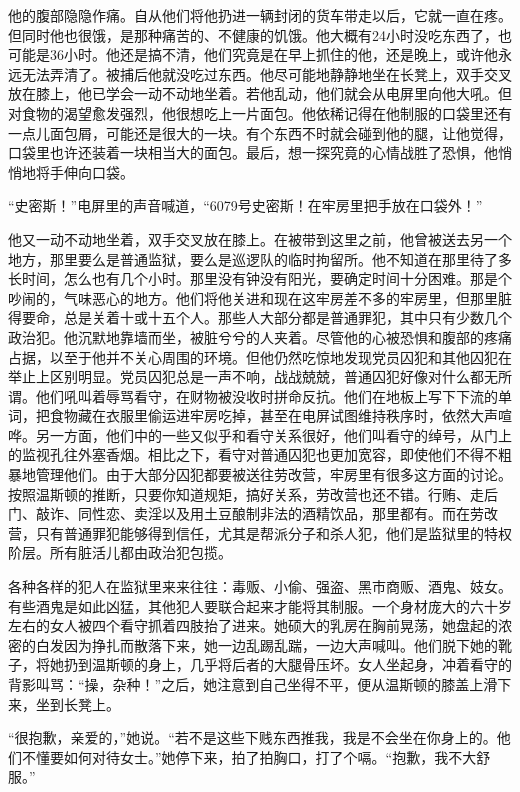 他的腹部隐隐作痛。自从他们将他扔进一辆封闭的货车带走以后，它就一直在疼。但同时他也很饿，是那种痛苦的、不健康的饥饿。他大概有24小时没吃东西了，也可能是36小时。他还是搞不清，他们究竟是在早上抓住的他，还是晚上，或许他永远无法弄清了。被捕后他就没吃过东西。他尽可能地静静地坐在长凳上，双手交叉放在膝上，他已学会一动不动地坐着。若他乱动，他们就会从电屏里向他大吼。但对食物的渴望愈发强烈，他很想吃上一片面包。他依稀记得在他制服的口袋里还有一点儿面包屑，可能还是很大的一块。有个东西不时就会碰到他的腿，让他觉得，口袋里也许还装着一块相当大的面包。最后，想一探究竟的心情战胜了恐惧，他悄悄地将手伸向口袋。

``史密斯！''电屏里的声音喊道，``6079号史密斯！在牢房里把手放在口袋外！''

他又一动不动地坐着，双手交叉放在膝上。在被带到这里之前，他曾被送去另一个地方，那里要么是普通监狱，要么是巡逻队的临时拘留所。他不知道在那里待了多长时间，怎么也有几个小时。那里没有钟没有阳光，要确定时间十分困难。那是个吵闹的，气味恶心的地方。他们将他关进和现在这牢房差不多的牢房里，但那里脏得要命，总是关着十或十五个人。那些人大部分都是普通罪犯，其中只有少数几个政治犯。他沉默地靠墙而坐，被脏兮兮的人夹着。尽管他的心被恐惧和腹部的疼痛占据，以至于他并不关心周围的环境。但他仍然吃惊地发现党员囚犯和其他囚犯在举止上区别明显。党员囚犯总是一声不响，战战兢兢，普通囚犯好像对什么都无所谓。他们吼叫着辱骂看守，在财物被没收时拼命反抗。他们在地板上写下下流的单词，把食物藏在衣服里偷运进牢房吃掉，甚至在电屏试图维持秩序时，依然大声喧哗。另一方面，他们中的一些又似乎和看守关系很好，他们叫看守的绰号，从门上的监视孔往外塞香烟。相比之下，看守对普通囚犯也更加宽容，即使他们不得不粗暴地管理他们。由于大部分囚犯都要被送往劳改营，牢房里有很多这方面的讨论。按照温斯顿的推断，只要你知道规矩，搞好关系，劳改营也还不错。行贿、走后门、敲诈、同性恋、卖淫以及用土豆酿制非法的酒精饮品，那里都有。而在劳改营，只有普通罪犯能够得到信任，尤其是帮派分子和杀人犯，他们是监狱里的特权阶层。所有脏活儿都由政治犯包揽。

各种各样的犯人在监狱里来来往往：毒贩、小偷、强盗、黑市商贩、酒鬼、妓女。有些酒鬼是如此凶猛，其他犯人要联合起来才能将其制服。一个身材庞大的六十岁左右的女人被四个看守抓着四肢抬了进来。她硕大的乳房在胸前晃荡，她盘起的浓密的白发因为挣扎而散落下来，她一边乱踢乱踹，一边大声喊叫。他们脱下她的靴子，将她扔到温斯顿的身上，几乎将后者的大腿骨压坏。女人坐起身，冲着看守的背影叫骂：``操，杂种！''之后，她注意到自己坐得不平，便从温斯顿的膝盖上滑下来，坐到长凳上。

``很抱歉，亲爱的，''她说。``若不是这些下贱东西推我，我是不会坐在你身上的。他们不懂要如何对待女士。''她停下来，拍了拍胸口，打了个嗝。``抱歉，我不大舒服。''

